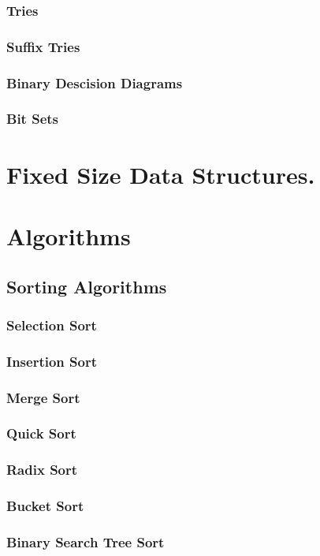\documentclass[12pt, letterpaper]{book}
\begin{document}
\section{Tries}
\section{Suffix Tries}
\section{Binary Descision Diagrams} \label{bdds}
\section{Bit Sets}

\part{Fixed Size Data Structures.}

\part{Algorithms}

	\chapter{Sorting Algorithms}

		\section{Selection Sort}
		\section{Insertion Sort}
		\section{Merge Sort}
		\section{Quick Sort}
		\section{Radix Sort}
		\section{Bucket Sort}
		\section{Binary Search Tree Sort}
\end{document}
